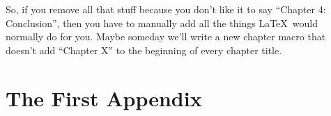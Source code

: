 \documentclass[12pt,twoside]{reedthesis}
\begin{document}
So, if you remove all that stuff because you don't like it to say ``Chapter 4: Conclusion'', then you have to manually add all the things \LaTeX\ would normally do for you. Maybe someday we'll write a new chapter macro that doesn't add ``Chapter X'' to the beginning of every chapter title.


    \appendix
      \chapter{The First Appendix}
      


  \backmatter %

    \nocite{*}


%  
 

\end{document}
